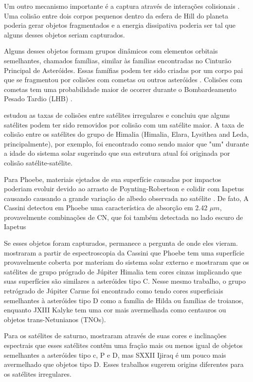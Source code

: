 \documentclass[12pt,a4paper]{monografia}
\begin{document}
Um outro mecanismo importante é a captura através de interações colisionais \citep{Sheppard2005}. Uma colisão entre dois corpos pequenos dentro da esfera de Hill do planeta poderia gerar objetos fragmentados e a energia dissipativa poderia ser tal que alguns desses objetos seriam capturados.

Alguns desses objetos formam grupos dinâmicos com elementos orbitais semelhantes, chamados famílias, similar às famílias encontradas no Cinturão Principal de Asteróides. Essas famífias podem ter sido criadas por um corpo pai que se fragmentou por colisões com cometas ou outros asteróides \citep{Nesvorny2004}. Colisões com cometas tem uma probabilidade maior de ocorrer durante o Bombardeamento Pesado Tardio (LHB) \citep{Gomes2005}.

\cite{Nesvorny2003} estudou as taxas de colisões entre satélites irregulares e concluiu que alguns satélites podem ter sido removidos por colisão com um satélite maior. A taxa de colisão entre os satélites do grupo de Himalia (Himalia, Elara, Lysithea and Leda, principalmente), por exemplo, foi encontrado como sendo maior que "um" durante a idade do sistema solar sugerindo que sua estrutura atual foi originada por colisão satélite-satélite.

Para Phoebe, materiais ejetados de sua superfície causadas por impactos poderiam evoluir devido ao arrasto de Poynting-Robertson e colidir com Iapetus causando causando a grande variação de albedo observada no satélite \citep{Nesvorny2003}. De fato, A Cassini detectou em Phoebe uma característica de absorção em 2.42 $\mu m$, provavelmente combinações de CN, que foi também detectada no lado escuro de Iapetus \citep{Clark2005}

Se esses objetos foram capturados, permanece a pergunta de onde eles vieram. \citealp{Clark2005} mostraram a partir de espectroscopia da Cassini que Phoebe tem uma superfície provavelmente coberta por materiam do sistema solar externo e \citealp{Grav2003} mostraram que os satélites de grupo prógrado de Júpiter Himalia tem cores cinzas implicando que suas superfícies são similares a asteróides tipo C. Nesse mesmo trabalho, o grupo retrógrado de Júpiter Carme foi encontrado como tendo cores superficiais semelhantes à asteróides tipo D como a família de Hilda ou famílias de troianos, enquanto JXIII Kalyke tem uma cor mais avermelhada como centauros ou objetos trans-Netunianos (TNOs).

Para os satélites de saturno, \citealp{Grav2007} mostraram através de suas cores e inclinações espectrais que esses satélites contêm uma fração mais ou menos igual de objetos semelhantes a asteróides tipo c, P e D, mas SXXII Ijiraq é um pouco mais avermelhado que objetos tipo D. Esses trabalhos sugerem origins diferentes para os satélites irregulares.
\end{document}
